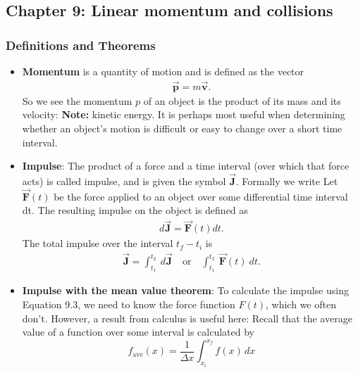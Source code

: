 \documentclass{report}
\begin{document}
    \pagebreak 
    \subsection{Chapter 9: Linear momentum and collisions}
    \bigbreak \noindent 
    \subsubsection{Definitions and Theorems}
    \begin{itemize}
        \item \textbf{Momentum} is a quantity of motion and is defined as the vector 
            \begin{align*}
                \vec{\mathbf{p}} = m\vec{\mathbf{v}}
            .\end{align*}
            \bigbreak \noindent 
            So we see the momentum $p$ of an object is the product of its mass and its velocity:
            \bigbreak \noindent 
            \textbf{Note:} kinetic energy. It is perhaps most useful when determining whether an object’s motion is difficult or easy to change over a short time interval.
        \item \textbf{Impulse}: The product of a force and a time interval (over which that force acts) is called impulse, and is given the symbol  $\vec{\mathbf{J}}$. Formally we write
            \bigbreak \noindent 
            Let  $\vec{\mathbf{F}}(t)$
            be the force applied to an object over some differential time interval dt. The resulting impulse on the object is defined as
            \begin{align*}
                d\vec{\mathbf{J}} = \vec{\mathbf{F}}(t)dt
            .\end{align*}
            \bigbreak \noindent 
            The total impulse over the interval $t_{f} - t_{i}$ is
            \begin{align*}
                \vec{\mathbf{J}} = \int_{t_{1}}^{t_{2}}\ d\vec{\mathbf{J}} \quad \text{or} \quad \int_{t_{1}}^{t_{2}}\ \vec{\mathbf{F}}(t)\ dt
            .\end{align*}
        \item \textbf{Impulse with the mean value theorem}:
            To calculate the impulse using Equation 9.3, we need to know the force function $F(t)$, which we often don’t. However, a result from calculus is useful here: Recall that the average value of a function over some interval is calculated by
            \[
                f_{\text{ave}}(x) = \frac{1}{\Delta x} \int_{x_i}^{x_f} f(x) \, dx
\]
\end{itemize}
\end{document}
